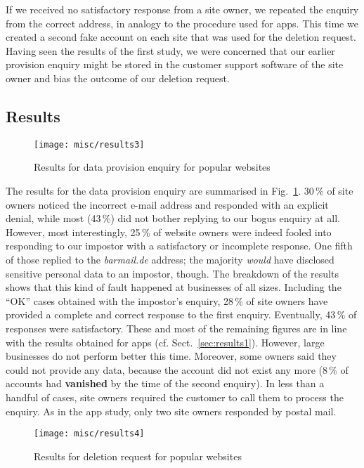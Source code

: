 \documentclass{llncs}
\begin{document}
If we received no satisfactory response from a site owner, we repeated the enquiry from the correct address, in analogy to the procedure used for apps. This time we created a second fake account on each site that was used for the deletion request. Having seen the results of the first study, we were concerned that our earlier provision enquiry might be stored in the customer support software of the site owner and bias the outcome of our deletion request.

\subsection{Results}

\begin{figure}[t]
\centering
 \texttt{[image: misc/results3]}
 \caption{\label{r3}Results for data provision enquiry for popular websites}
\end{figure}

The results for the data provision enquiry are summarised in Fig.~\ref{r3}. 30\,\% of site owners noticed the incorrect e-mail address and responded with an explicit denial, while most (43\,\%) did not bother replying to our bogus enquiry at all. However, most interestingly, 25\,\% of website owners were indeed fooled into responding to our impostor with a satisfactory or incomplete response. One fifth of those replied to the \emph{barmail.de} address; the majority \emph{would} have disclosed sensitive personal data to an impostor, though. The breakdown of the results shows that this kind of fault happened at businesses of all sizes.
Including the ``OK'' cases obtained with the impostor's enquiry, 28\,\% of site owners have provided a complete and correct response to the first enquiry. Eventually, 43\,\% of responses were satisfactory. These and most of the remaining figures are in line with the results obtained for apps (cf. Sect.~\ref{sec:results1}). However, large businesses do not perform better this time. Moreover, some owners said they could not provide any data, because the account did not exist any more (8\,\% of accounts had \textbf{vanished} by the time of the second enquiry). In less than a handful of cases, site owners required the customer to call them to process the enquiry. As in the app study, only two site owners responded by postal mail.

\begin{figure}[t]
\centering
 \texttt{[image: misc/results4]}
 \caption{\label{r4}Results for deletion request for popular websites}
\end{figure}
\end{document}
